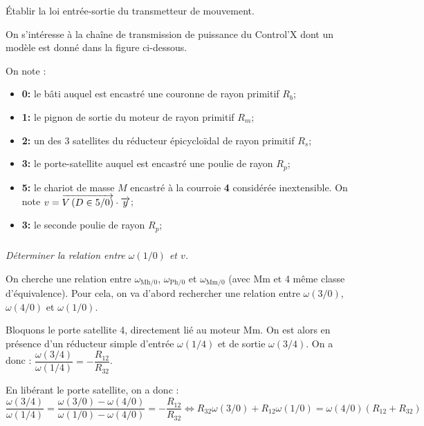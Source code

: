 \documentclass[10pt,fleqn]{article} %
\begin{document}

\vspace{7cm}
\pagestyle{fancy}
\thispagestyle{plain}


\def\columnseprulecolor{\color{ocre}}
\setlength{\columnseprule}{0.4pt} 

\begin{multicols}{2}

\begin{obj} Établir la loi entrée-sortie du transmetteur de mouvement. 
\end{obj}


On s'intéresse à la chaîne de transmission de puissance du Control'X dont un modèle est donné dans la figure ci-dessous.

On note : 
\begin{itemize}
\item \textbf{0:} le bâti auquel est encastré une couronne de rayon primitif $R_b$;
\item \textbf{1:} le pignon de sortie du moteur de rayon primitif $R_m$;
\item \textbf{2:} un des 3 satellites du réducteur épicycloïdal de rayon primitif $R_s$;
\item \textbf{3:} le porte-satellite auquel est encastré une poulie de rayon $R_p$;
\item \textbf{5:} le chariot de masse $M$ encastré à la courroie \textbf{4} considérée inextensible. On note $v=\overrightarrow{V\left( {D} \in {5}/{0}\right)}\cdot \overrightarrow{y}$;
\item \textbf{3:} le seconde poulie de rayon $R_p$;
\end{itemize}
\subparagraph{}
\textit{Déterminer la relation entre $\omega(1/0)$ et $v$.}



\ifprof
\begin{corrige}
On cherche une relation entre $\omega_{\text{Mh}/0}$, $\omega_{\text{Ph}/0}$ et $\omega_{\text{Mm}/0}$ (avec Mm et 4 même classe d'équivalence). Pour cela, on va d'abord rechercher une relation entre $\omega(3/0)$, $\omega(4/0)$ et $\omega(1/0)$.

Bloquons le porte satellite 4, directement lié au moteur Mm. On est alors en présence d'un réducteur simple d'entrée  $\omega(1/4)$ et de sortie $\omega(3/4)$. On a donc : 
$\dfrac{\omega(3/4)}{\omega(1/4)} = -\dfrac{R_{12}}{R_{32}}$. 

En libérant le porte satellite, on a donc :
$ \dfrac{\omega(3/4)}{\omega(1/4)}
= \dfrac{\omega(3/0)-\omega(4/0)}{\omega(1/0)-\omega(4/0)}
= -\dfrac{R_{12}}{R_{32}}
\Leftrightarrow 
R_{32} \omega(3/0) +R_{12}\omega(1/0) = \omega(4/0)\left(R_{12}+R_{32}\right)$


\end{corrige}
\end{multicols}
\end{document}
